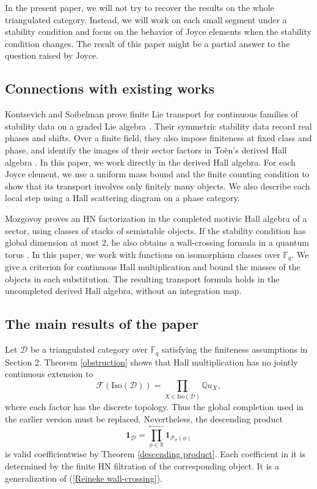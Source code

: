 \documentclass[a4paper,12pt]{amsart}
\numberwithin{equation}{section}
\newcommand{\Iso}{\mathrm{Iso}}
\newcommand{\1}{\mathbf{1}}
\begin{document}
In the present paper, we will not try to recover the results on the whole triangulated category. Instead, we will work on each small segment under a stability condition and focus on the behavior of Joyce elements when the stability condition changes. The result of this paper might be a partial answer to the question \cite[Problem 7.1]{Joy2008} raised by Joyce.

\subsection{Connections with existing works}
Kontsevich and Soibelman prove finite Lie transport for continuous families of stability data on a graded Lie algebra \cite[Section 2.3, Corollary 1]{KS2008}. Their symmetric stability data record real phases and shifts. Over a finite field, they also impose finiteness at fixed class and phase, and identify the images of their sector factors in To\"en's derived Hall algebra \cite[Section 2.2, Definition 2; Section 6.1, Proposition 12]{KS2008}. In this paper, we work directly in the derived Hall algebra. For each Joyce element, we use a uniform mass bound and the finite counting condition to show that its transport involves only finitely many objects. We also describe each local step using a Hall scattering diagram on a phase category.

Mozgovoy \cite[Theorem 5.3]{Moz2022} proves an HN factorization in the completed motivic Hall algebra of a sector, using classes of stacks of semistable objects. If the stability condition has global dimension at most $2$, he also obtains a wall-crossing formula in a quantum torus \cite[Sections 5.4--5.6]{Moz2022}. In this paper, we work with functions on isomorphism classes over $\mathbb{F}_q$. We give a criterion for continuous Hall multiplication and bound the masses of the objects in each substitution. The resulting transport formula holds in the uncompleted derived Hall algebra, without an integration map.

\subsection{The main results of the paper}
Let $\mathcal{D}$ be a triangulated category over $\mathbb{F}_q$ satisfying the finiteness assumptions in Section 2. Theorem \ref{obstruction} shows that Hall multiplication has no jointly continuous extension to
\[\mathscr{F}(\Iso(\mathcal{D}))=\prod_{X\in\Iso(\mathcal{D})}\mathbb{Q}u_X,\]
where each factor has the discrete topology. Thus the global completion used in the earlier version \cite{GX2025} must be replaced. Nevertheless, the descending product
\[\1_{\mathcal{D}}=\prod_{\phi\in\mathbb{R}}^{\leftarrow}\1_{\mathcal{P}_\sigma(\phi)}\]
is valid coefficientwise by Theorem \ref{descending product}. Each coefficient in it is determined by the finite HN filtration of the corresponding object. It is a generalization of (\ref{Reineke wall-crossing}).
\end{document}
